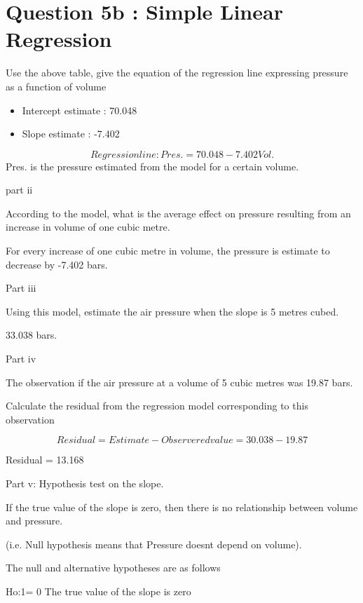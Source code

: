 \documentclass[]{report}
\begin{document}

\newpage

\section{Question 5b : Simple Linear Regression}

Use the above table, give the equation of the regression line expressing pressure as a function of volume

\begin{itemize}
	\item  Intercept estimate :	 70.048
	\item Slope estimate :         -7.402
\end{itemize}

\[
Regression line  : Pres.= 70.048 - 7.402Vol. 
\]
Pres.  is the pressure estimated from the model for a certain volume. 




part ii

According to the model, what is the average effect on pressure resulting from an increase in volume of one cubic metre.


For every increase of one cubic metre in volume, the pressure is estimate to decrease by -7.402  bars.


Part iii

Using this model, estimate the air pressure when the slope is 5 metres cubed.

33.038 bars.

Part iv

The observation if the air pressure at a volume of 5 cubic metres was 19.87 bars.

Calculate the residual from the regression model corresponding to this observation

\[Residual = Estimate - Observered value = 30.038 - 19.87\]

Residual = 13.168 

Part v: Hypothesis test on the slope.


If the true value of the slope is zero, then there is no relationship between volume and pressure.

(i.e. Null hypothesis means that Pressure doesnt depend on volume).


The null and alternative hypotheses are as follows

Ho:1= 0  	 The true value of the slope is zero
\end{document}
